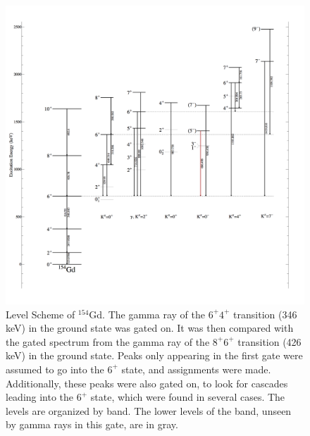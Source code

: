 \begin{figure}
    \centering
    \includegraphics[scale=0.2]{154GdTablesAndFigs/154Gd_6to4.png}
    \caption{Level Scheme of $^{154}$Gd. The gamma ray of the $6^+$\rightarrow$4^+$ transition (346 keV) in the ground state was gated on. It was then compared with the gated spectrum from the gamma ray of the $8^+$\rightarrow$6^+$ transition (426 keV) in the ground state. Peaks only appearing in the first gate were assumed to go into the $6^+$ state, and assignments were made. Additionally, these peaks were also gated on, to look for cascades leading into the $6^+$ state, which were found in several cases. The levels are organized by band. The lower levels of the band, unseen by gamma rays in this gate, are in gray.}
    \label{fig:154_6to4}
\end{figure}